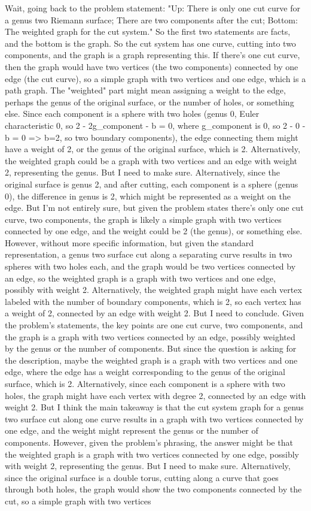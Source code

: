 Wait, going back to the problem statement: "Up: There is only one cut curve for a genus two Riemann surface; There are two components after the cut; Bottom: The weighted graph for the cut system." So the first two statements are facts, and the bottom is the graph. So the cut system has one curve, cutting into two components, and the graph is a graph representing this. If there's one cut curve, then the graph would have two vertices (the two components) connected by one edge (the cut curve), so a simple graph with two vertices and one edge, which is a path graph. The "weighted" part might mean assigning a weight to the edge, perhaps the genus of the original surface, or the number of holes, or something else. Since each component is a sphere with two holes (genus 0, Euler characteristic 0, so 2 - 2g_component - b = 0, where g_component is 0, so 2 - 0 - b = 0 => b=2, so two boundary components), the edge connecting them might have a weight of 2, or the genus of the original surface, which is 2. Alternatively, the weighted graph could be a graph with two vertices and an edge with weight 2, representing the genus. But I need to make sure. Alternatively, since the original surface is genus 2, and after cutting, each component is a sphere (genus 0), the difference in genus is 2, which might be represented as a weight on the edge. But I'm not entirely sure, but given the problem states there's only one cut curve, two components, the graph is likely a simple graph with two vertices connected by one edge, and the weight could be 2 (the genus), or something else. However, without more specific information, but given the standard representation, a genus two surface cut along a separating curve results in two spheres with two holes each, and the graph would be two vertices connected by an edge, so the weighted graph is a graph with two vertices and one edge, possibly with weight 2. Alternatively, the weighted graph might have each vertex labeled with the number of boundary components, which is 2, so each vertex has a weight of 2, connected by an edge with weight 2. But I need to conclude. Given the problem's statements, the key points are one cut curve, two components, and the graph is a graph with two vertices connected by an edge, possibly weighted by the genus or the number of components. But since the question is asking for the description, maybe the weighted graph is a graph with two vertices and one edge, where the edge has a weight corresponding to the genus of the original surface, which is 2. Alternatively, since each component is a sphere with two holes, the graph might have each vertex with degree 2, connected by an edge with weight 2. But I think the main takeaway is that the cut system graph for a genus two surface cut along one curve results in a graph with two vertices connected by one edge, and the weight might represent the genus or the number of components. However, given the problem's phrasing, the answer might be that the weighted graph is a graph with two vertices connected by one edge, possibly with weight 2, representing the genus. But I need to make sure. Alternatively, since the original surface is a double torus, cutting along a curve that goes through both holes, the graph would show the two components connected by the cut, so a simple graph with two vertices 